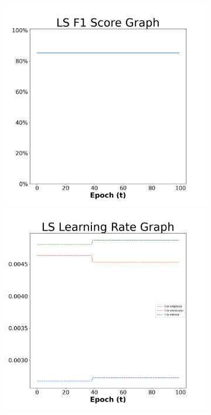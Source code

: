 \begin{figure}[H]
    \centering %
\begin{subfigure}{0.3\textwidth}
  \includegraphics[width=\linewidth]{images/exper2/iris/LS_0.01_f1.png}
    \includegraphics[width=\linewidth]{images/exper2/iris/LS_0.01_lr.png}

\end{subfigure}
\end{figure}
